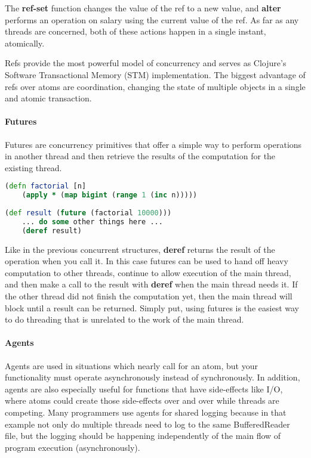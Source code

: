     The \textbf{ref-set} function changes the value of the ref to a new value, and \textbf{alter} performs an operation on salary using the current value of the ref. As far as any threads are concerned, both of these actions happen in a single instant, atomically.
    
    Refs provide the most powerful model of concurrency and serves as Clojure's Software Transactional Memory (STM) implementation. The biggest advantage of refs over atoms are coordination, changing the state of multiple objects in a single and atomic transaction.
    
    \paragraph{Futures}
    
    Futures are concurrency primitives that offer a simple way to perform operations in another thread and then retrieve the results of the computation for the existing thread. 
    
    \begin{lstlisting}[language=clojure]
(defn factorial [n]
    (apply * (map bigint (range 1 (inc n))))) 
    
(def result (future (factorial 10000)))
	... do some other things here ...
	(deref result)
    \end{lstlisting}
    
    Like in the previous concurrent structures, \textbf{deref} returns the result of the operation when you call it. In this case futures can be used to hand off heavy computation to other threads, continue to allow execution of the main thread, and then make a call to the result with \textbf{deref} when the main thread needs it. If the other thread did not finish the computation yet, then the main thread will block until a result can be returned. Simply put, using futures is the easiest way to do threading that is unrelated to the work of the main thread.
    
    \paragraph{Agents}
    
    Agents are used in situations which nearly call for an atom, but your functionality must operate asynchronously instead of synchronously. In addition, agents are also especially useful for functions that have side-effects like I/O, where atoms could create those side-effects over and over while threads are competing. Many programmers use agents for shared logging because in that example not only do multiple threads need to log to the same BufferedReader file, but the logging should be happening independently of the main flow of program execution (asynchronously).
    
